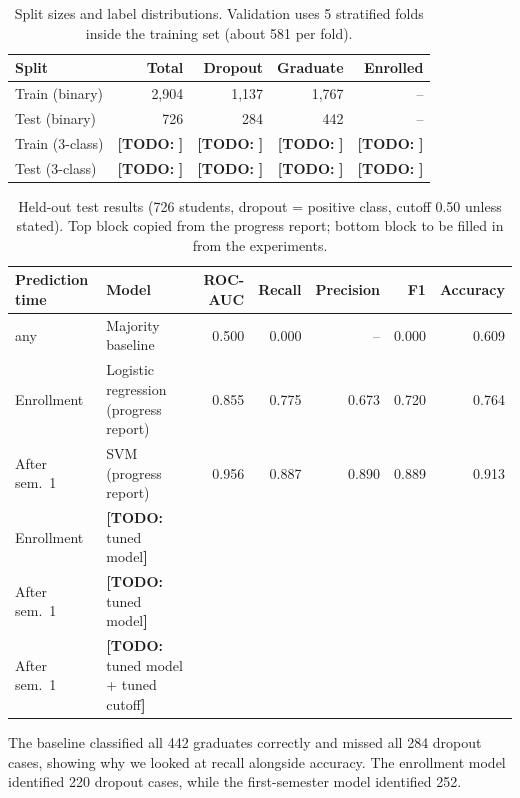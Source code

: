 \documentclass[11pt]{article}
\newcommand{\todo}[1]{{\color{red}\textbf{[TODO:} #1\textbf{]}}}
\newcommand{\todo}[1]{}
\begin{document}
\begin{table}[t]
  \centering
  \small
  \setlength{\tabcolsep}{3pt}
  \begin{tabular}{lrrrr}
    \hline
    \textbf{Split} & \textbf{Total} & \textbf{Dropout} & \textbf{Graduate} & \textbf{Enrolled} \\
    \hline
    Train (binary) & 2,904 & 1,137 & 1,767 & -- \\
    Test (binary)  & 726   & 284   & 442   & -- \\
    Train (3-class) & \todo{} & \todo{} & \todo{} & \todo{} \\
    Test (3-class)  & \todo{} & \todo{} & \todo{} & \todo{} \\
    \hline
  \end{tabular}
  \caption{\label{tab:splits}
    Split sizes and label distributions. Validation uses 5 stratified folds inside the training set (about 581 per fold).
  }
\end{table}

\begin{table}[t]
  \centering
  \small
  \begin{tabular}{llrrrrr}
    \hline
    \textbf{Prediction time} & \textbf{Model} & \textbf{ROC-AUC} & \textbf{Recall} & \textbf{Precision} & \textbf{F1} & \textbf{Accuracy} \\
    \hline
    any & Majority baseline & 0.500 & 0.000 & -- & 0.000 & 0.609 \\
    Enrollment & Logistic regression (progress report) & 0.855 & 0.775 & 0.673 & 0.720 & 0.764 \\
    After sem.\ 1 & SVM (progress report) & 0.956 & 0.887 & 0.890 & 0.889 & 0.913 \\
    \hline
    Enrollment & \todo{tuned model} & & & & & \\
    After sem.\ 1 & \todo{tuned model} & & & & & \\
    After sem.\ 1 & \todo{tuned model + tuned cutoff} & & & & & \\
    \hline
  \end{tabular}
  \caption{\label{tab:results}
    Held-out test results (726 students, dropout = positive class, cutoff 0.50 unless stated). Top block copied from the progress report; bottom block to be filled in from the experiments.
  }
\end{table}

The baseline classified all 442 graduates correctly and missed all 284 dropout cases, showing why we looked at recall alongside accuracy. The enrollment model identified 220 dropout cases, while the first-semester model identified 252.
\end{document}
